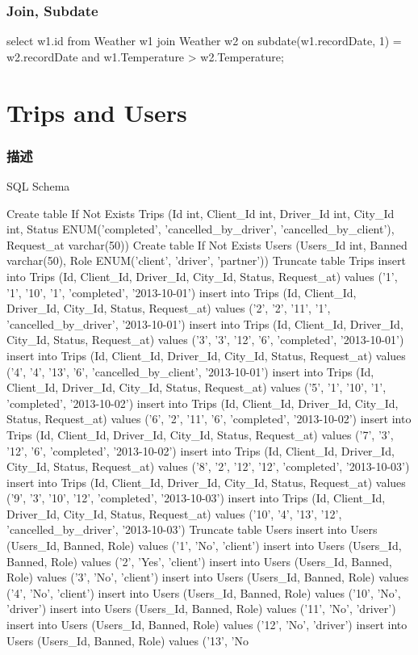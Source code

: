 \subsubsection{Join, Subdate}
\begin{Code}
select
    w1.id
from
    Weather w1
join
    Weather w2
on
    subdate(w1.recordDate, 1) = w2.recordDate
    and w1.Temperature > w2.Temperature;
\end{Code}

\section{Trips and Users} %
\label{sec:trips-and-users}


\subsubsection{描述}
SQL Schema

\begin{Code}
Create table If Not Exists Trips (Id int, Client_Id int, Driver_Id int, City_Id int, Status ENUM('completed', 'cancelled_by_driver', 'cancelled_by_client'), Request_at varchar(50))
Create table If Not Exists Users (Users_Id int, Banned varchar(50), Role ENUM('client', 'driver', 'partner'))
Truncate table Trips
insert into Trips (Id, Client_Id, Driver_Id, City_Id, Status, Request_at) values ('1', '1', '10', '1', 'completed', '2013-10-01')
insert into Trips (Id, Client_Id, Driver_Id, City_Id, Status, Request_at) values ('2', '2', '11', '1', 'cancelled_by_driver', '2013-10-01')
insert into Trips (Id, Client_Id, Driver_Id, City_Id, Status, Request_at) values ('3', '3', '12', '6', 'completed', '2013-10-01')
insert into Trips (Id, Client_Id, Driver_Id, City_Id, Status, Request_at) values ('4', '4', '13', '6', 'cancelled_by_client', '2013-10-01')
insert into Trips (Id, Client_Id, Driver_Id, City_Id, Status, Request_at) values ('5', '1', '10', '1', 'completed', '2013-10-02')
insert into Trips (Id, Client_Id, Driver_Id, City_Id, Status, Request_at) values ('6', '2', '11', '6', 'completed', '2013-10-02')
insert into Trips (Id, Client_Id, Driver_Id, City_Id, Status, Request_at) values ('7', '3', '12', '6', 'completed', '2013-10-02')
insert into Trips (Id, Client_Id, Driver_Id, City_Id, Status, Request_at) values ('8', '2', '12', '12', 'completed', '2013-10-03')
insert into Trips (Id, Client_Id, Driver_Id, City_Id, Status, Request_at) values ('9', '3', '10', '12', 'completed', '2013-10-03')
insert into Trips (Id, Client_Id, Driver_Id, City_Id, Status, Request_at) values ('10', '4', '13', '12', 'cancelled_by_driver', '2013-10-03')
Truncate table Users
insert into Users (Users_Id, Banned, Role) values ('1', 'No', 'client')
insert into Users (Users_Id, Banned, Role) values ('2', 'Yes', 'client')
insert into Users (Users_Id, Banned, Role) values ('3', 'No', 'client')
insert into Users (Users_Id, Banned, Role) values ('4', 'No', 'client')
insert into Users (Users_Id, Banned, Role) values ('10', 'No', 'driver')
insert into Users (Users_Id, Banned, Role) values ('11', 'No', 'driver')
insert into Users (Users_Id, Banned, Role) values ('12', 'No', 'driver')
insert into Users (Users_Id, Banned, Role) values ('13', 'No
\end{Code}


